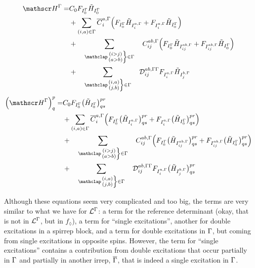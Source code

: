 \documentclass[a4paper,11pt]{article}
\begin{document}
\begin{equation}
  \begin{split}
    \bigH^\irp = &
    C_0 F_{I_0^\irp} \tilde{H}_{I_0^\irp}\\
    & + \sum_{(i,a) \in \irp} \overline{C}_i^{a,\irp}
    \Big(
        F_{I_0^\irp} \tilde{H}_{I_{i}^{a,\irp}}
        + F_{I_{i}^{a,\irp}} \tilde{H}_{I_0^\irp}
    \Big)\\
    & + \sumijabrestr C_{ij}^{ab, \irp}
    \Big(
        F_{I_0^\irp} \tilde{H}_{I_{ij}^{ab,\irp}}
        + F_{I_{ij}^{ab,\irp}} \tilde{H}_{I_0^\irp}
    \Big)\\
    & + \sumijabfull \Dmix_{ij}^{ab, \irp\irp}
    F_{I_i^{a,\irp}} \tilde{H}_{I_j^{b,\irp}}
  \end{split}
\end{equation}
\begin{equation}
  \begin{split}
    \Big( \bigH^\irp \Big)^p_q = &
    C_0 F_{I_0^\irp} \big( \tilde{H}_{I_0^\irp} \big)^{pr}_{qs}\\
    & + \sum_{(i,a) \in \irp} \overline{C}_i^{a,\irp}
    \Big(
        F_{I_0^\irp} \big( \tilde{H}_{I_{i}^{a,\irp}} \big)^{pr}_{qs}
        + F_{I_{i}^{a,\irp}} \big( \tilde{H}_{I_0^\irp} \big)^{pr}_{qs}
    \Big)\\
    & + \sumijabrestr C_{ij}^{ab, \irp}
    \Big(
        F_{I_0^\irp} \big( \tilde{H}_{I_{ij}^{ab,\irp}} \big)^{pr}_{qs}
        + F_{I_{ij}^{ab,\irp}} \big( \tilde{H}_{I_0^\irp} \big)^{pr}_{qs}
    \Big)\\
    & + \sumijabfull \Dmix_{ij}^{ab, \irp\irp}
    F_{I_i^{a,\irp}} \big( \tilde{H}_{I_j^{b,\irp}} \big)^{pr}_{qs}
  \end{split}
\end{equation}

Although these equations seem very complicated and too big, the terms are very similar to what we have for $\mathcal{L}^{\Gamma}$:
a term for the reference determinant (okay, that is not in $\mathcal{L}^{\Gamma}$, but in $f_\lozenge$), a term for ``single excitations'', another for double excitations in a spirrep block, and a term for double excitations in $\Gamma$, but coming from single excitations in opposite spins.
However, the term for ``single excitations'' contains a contribution from double excitations that occur partially in $\Gamma$ and partially in another irrep, ${\overline{\Gamma}}$, that is indeed a single excitation in $\Gamma$.
\end{document}
